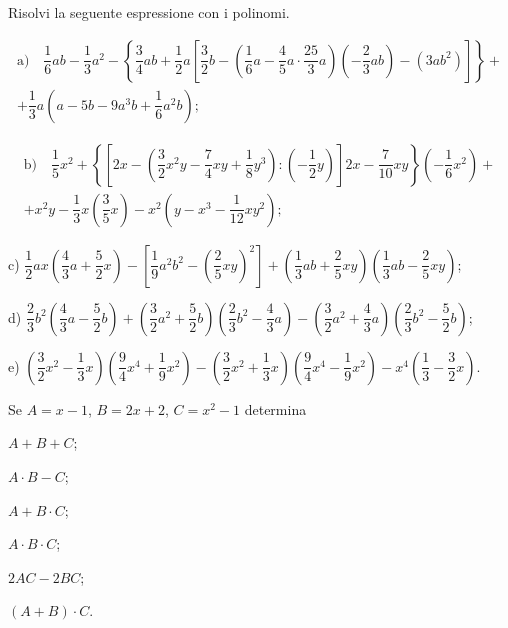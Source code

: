 \begin{esercizio}[\Ast]
	\label{ese:11.52} %
	Risolvi la seguente espressione con i polinomi.

		\begin{multline*}
			\text{a)} \quad \dfrac{1}{6}ab-\dfrac{1}{3}a^{2}-\left\{\dfrac{3}{4}ab+\dfrac{1}{2}a\left[\dfrac{3}{2}b-\left(\dfrac{1}{6}a-\dfrac{4}{5}a\cdot {\dfrac{25}{3}a}\right)\left(-{\dfrac{2}{3}ab}\right)-\left(3ab^{2}\right)\right]\right\}+\\
			+\dfrac{1}{3}a\left(a-5b-9a^{3}b+\dfrac{1}{6}a^{2}b\right);
		\end{multline*}

		\begin{multline*}
			\text{b)} \quad \dfrac{1}{5}x^{2}+\left\{\left[2x-\left(\dfrac{3}{2}x^{2}y-\dfrac{7}{4}xy+\dfrac{1}{8}y^{3}\right):\left(-{\dfrac{1}{2}y}\right)\right] 2x-\dfrac{7}{10}xy\right\}\left(-{\dfrac{1}{6}x^{2}}\right)+\\
			+x^{2}y-\dfrac{1}{3}x\left(\dfrac{3}{5}x\right)-x^{2}\left(y-x^{3}-\dfrac{1}{12}xy^{2}\right);
		\end{multline*}
		
		c) \quad $\dfrac{1}{2}ax\left(\dfrac{4}{3}a+\dfrac{5}{2}x\right)-\left[\dfrac{1}{9}a^{2}b^{2}-\left(\dfrac{2}{5}xy\right)^2\right]+\left(\dfrac{1}{3}ab+\dfrac{2}{5}xy\right)\left(\dfrac{1}{3}ab-\dfrac{2}{5}xy\right)$;
		
		d) \quad $\dfrac{2}{3}b^{2}\left(\dfrac{4}{3}a-\dfrac{5}{2}b\right)+\left(\dfrac{3}{2}a^{2}+\dfrac{5}{2}b\right)\left(\dfrac{2}{3}b^{2}-\dfrac{4}{3}a\right)-\left(\dfrac{3}{2}a^{2}+\dfrac{4}{3}a\right)\left(\dfrac{2}{3}b^{2}-\dfrac{5}{2}b\right)$;
		
		e) \quad $\left(\dfrac{3}{2}x^{2}-\dfrac{1}{3}x\right)\left(\dfrac{9}{4}x^{4}+\dfrac{1}{9}x^{2}\right)-\left(\dfrac{3}{2}x^{2}+\dfrac{1}{3}x\right)\left(\dfrac{9}{4}x^{4}-\dfrac{1}{9}x^{2}\right)-x^{4}\left(\dfrac{1}{3}-\dfrac{3}{2}x\right)$.
\end{esercizio}

\begin{esercizio}[\Ast]
\label{ese:11.53}
Se $A=x-1$, $B=2x+2$, $C=x^2-1$ determina
\begin{multicols}{3}
\begin{enumeratea}
\item $A+B+C$;
\item $A\cdot B-C$;
\item $A+B\cdot C$;
\item $A\cdot B\cdot C$;
\item $2AC-2BC$;
\item $(A+B)\cdot C$.
\end{enumeratea}
\end{multicols}
\end{esercizio}

